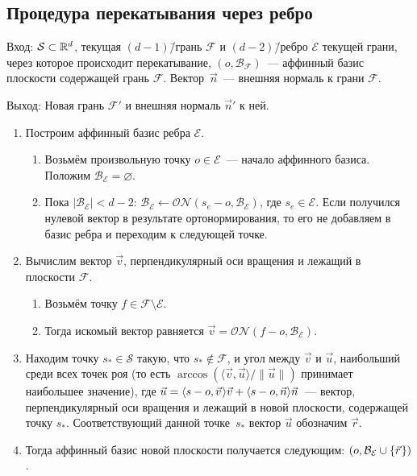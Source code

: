 \documentclass[a4paper,12pt]{article}
\newcommand{\R}[1][]{%
  \ifthenelse{\equal{#1}{}}%
  {\mathbb{R}}%
  {\mathbb{R}^{#1}}}
\newcommand{\Swarm}{\mathcal{S}}              %
\newcommand{\Facet}{\mathcal{F}}              %
\newcommand{\Edge}{\mathcal{E}}               %
\newcommand{\Basis}{\mathcal{B}}              %
\newcommand{\norm}[2][]{#1\lVert #2 #1\rVert}             %
\newcommand{\set}[2][]{#1\{ #2 #1\}}                    %
\newcommand{\scalprod}[3][]{#1\langle #2, #3 #1\rangle} %
\newcommand{\ONorm}[3][]{\mathcal{ON}#1( #2, #3 #1)} %
\renewcommand{\.}{\hspace{0.2ex}}
\begin{document}
  \subsection{Процедура перекатывания через ребро}
  \label{GW:RollOverEdge}
    Вход: $\Swarm \subset \R[d]$, текущая $(d-1)$\=/грань $\Facet$ и $(d-2)$\=/ребро $\Edge$ текущей грани, через которое происходит перекатывание, $(o, \Basis_{\Facet})$~--- аффинный базис плоскости содержащей грань $\Facet$. Вектор~$\vec n$~--- внешняя нормаль к грани $\Facet$.

    Выход: Новая грань $\Facet'$ и внешняя нормаль $\vec n'$ к ней.

    \begin{enumerate}
      \item Построим аффинный базис ребра $\Edge$.
      \begin{enumerate}
        \item Возьмём произвольную точку $o \in \Edge$~--- начало аффинного базиса. Положим $\Basis_\Edge = \varnothing$.

        \item Пока $|\Basis_\Edge| < d-2$: $\Basis_\Edge \leftarrow \ONorm{s_e - o}{\Basis_\Edge}$, где $s_e \in \Edge$. Если получился нулевой вектор в результате ортонормирования, то его не добавляем в базис ребра и переходим к следующей точке.
      \end{enumerate}

      \item Вычислим вектор $\vec v$, перпендикулярный оси вращения и лежащий в плоскости $\Facet$.
      \begin{enumerate}
        \item Возьмём точку $f \in \Facet \setminus \Edge$.
        \item Тогда искомый вектор равняется $\vec v = \ONorm{f - o}{\Basis_\Edge}$.
      \end{enumerate}

      \item Находим точку $s_* \in \Swarm$ такую, что $s_* \notin \Facet$, и угол между $\vec v$ и $\vec u$, наибольший среди всех точек роя (то есть $\arccos(\scalprod{\vec v}{\vec u} / \norm{\vec u})$ принимает наибольшее значение), где $\vec u = \scalprod{s - o}{\vec v \.}\vec v + \scalprod{s - o}{\vec n}\vec n$~--- вектор, перпендикулярный оси вращения и лежащий в новой плоскости, содержащей точку $s_*$. Соответствующий данной точке~$s_*$ вектор $\vec u$ обозначим $\vec r$.

      \item Тогда аффинный базис новой плоскости получается следующим: $(o, \Basis_\Edge \cup \set{\vec r \.})$.


\end{enumerate}
\end{document}
